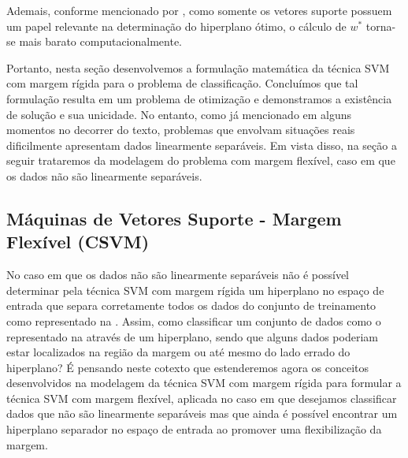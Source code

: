 \documentclass[12pt,a4paper]{scrartcl}
\theoremstyle{definition}%
\begin{document}
Ademais, conforme mencionado por \textcite{Evelin2017}, como somente os vetores suporte possuem um papel relevante na determinação do hiperplano ótimo, o cálculo de $w^{*}$ torna-se mais barato computacionalmente.

Portanto, nesta seção desenvolvemos a formulação matemática da técnica SVM com margem rígida para o problema de classificação. Concluímos que tal formulação resulta em um problema de otimização e demonstramos a existência de solução e sua unicidade. No entanto, como já mencionado em alguns momentos no decorrer do texto, problemas que envolvam situações reais dificilmente apresentam dados linearmente separáveis. Em vista disso, na seção a seguir trataremos da modelagem do problema com margem flexível, caso em que os dados não são linearmente separáveis.


\subsection{Máquinas de Vetores Suporte - Margem Flexível (CSVM)}  \label{subsection:SVM_margem_flexivel}

No caso em que os dados não são linearmente separáveis não é possível determinar pela técnica SVM com margem rígida um hiperplano no espaço de entrada que separa corretamente todos os dados do conjunto de treinamento como representado na . Assim, como classificar um conjunto de dados como o representado na  através de um hiperplano, sendo que alguns dados poderiam estar localizados na região da margem ou até mesmo do lado errado do hiperplano? É pensando neste cotexto que estenderemos agora os conceitos desenvolvidos na modelagem da técnica SVM com margem rígida para formular a técnica SVM com margem flexível, aplicada no caso em que desejamos classificar dados que não são linearmente separáveis mas que ainda é possível encontrar um hiperplano separador no espaço de entrada ao promover uma flexibilização da margem. 

\end{document}
